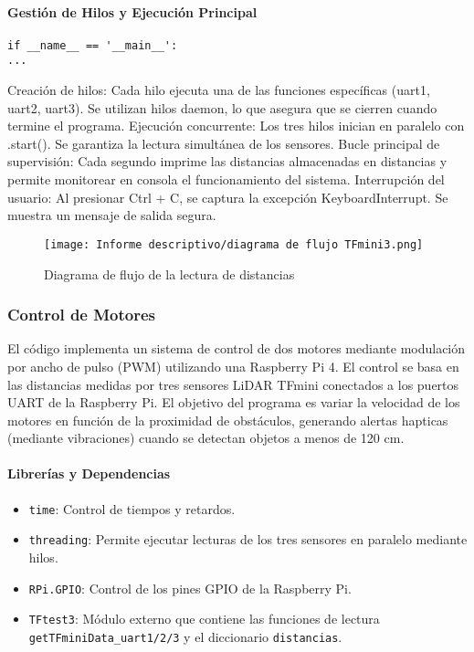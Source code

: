 \documentclass[12pt,a4paper]{article}
\begin{document}
\paragraph{Gestión de Hilos y Ejecución Principal}
\begin{verbatim}
if __name__ == '__main__':
...
\end{verbatim}
Creación de hilos: Cada hilo ejecuta una de las funciones específicas (uart1, uart2, uart3). Se utilizan hilos daemon, lo que asegura que se cierren cuando termine el programa. Ejecución concurrente: Los tres hilos inician en paralelo con .start(). Se garantiza la lectura simultánea de los sensores. Bucle principal de supervisión: Cada segundo imprime las distancias almacenadas en distancias y permite monitorear en consola el funcionamiento del sistema. Interrupción del usuario: Al presionar Ctrl + C, se captura la excepción KeyboardInterrupt. Se muestra un mensaje de salida segura.

\begin{figure}[H]
\noindent\hspace*{-0.7in}%
\texttt{[image: Informe descriptivo/diagrama de flujo TFmini3.png]}
\caption{Diagrama de flujo de la lectura de distancias}
\end{figure}

\subsubsection{Control de Motores}

El código implementa un sistema de control de dos motores mediante modulación por ancho de pulso (PWM) utilizando una Raspberry Pi 4.  
El control se basa en las distancias medidas por tres sensores LiDAR TFmini conectados a los puertos UART de la Raspberry Pi.  
El objetivo del programa es variar la velocidad de los motores en función de la proximidad de obstáculos, generando alertas hapticas (mediante vibraciones) cuando se detectan objetos a menos de 120 cm.


\paragraph{Librerías y Dependencias}

\begin{itemize}
    \item \texttt{time}: Control de tiempos y retardos.
    \item \texttt{threading}: Permite ejecutar lecturas de los tres sensores en paralelo mediante hilos.
    \item \texttt{RPi.GPIO}: Control de los pines GPIO de la Raspberry Pi.
    \item \texttt{TFtest3}: Módulo externo que contiene las funciones de lectura \texttt{getTFminiData\_uart1/2/3} y el diccionario \texttt{distancias}.
\end{itemize}
\end{document}

